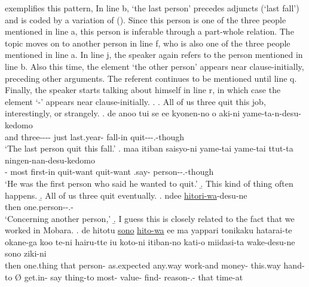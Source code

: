 \Next exemplifies this pattern,
In line b,  `the last person' precedes adjuncts (`last fall') and is coded by a variation of  ().
Since this person is one of the three people mentioned in line a,
this person is inferable
through a part-whole relation.
The topic moves on to another person in line f, who is also one of the three people mentioned in line a.
In line j, the speaker again refers to the person mentioned in line b.
Also this time, the element  `the other person' appears near clause-initially, preceding other arguments.
The referent continues to be mentioned until line q.
Finally, the speaker starts talking about himself in line r,
in which case the element  `-' appears near clause-initially.
%
\ex.
 \a. All of us three quit this job, interestingly, or strangely.
 \bg. de anoo  tui se ee kyonen-no o aki-ni yame-ta-n-desu-kedomo \\
 	and  three---- just   last.year-  fall-in quit---.-though \\
	`The last person quit this fall.'
 \bg.  maa itiban saisyo-ni yame-tai yame-tai ttut-ta ningen-nan-desu-kedomo \\
 		-  most first-in quit-want quit-want .say- person--.-though \\
		`He was the first person who said he wanted to quit.'
 \b. This kind of thing often happens.
 \b. All of us three quit eventually.
 \bg. ndee \ul{hitori-wa}-desu-ne \\
 		then one.person--.- \\
		`Concerning another person,'
 \b. I guess this is closely related to the fact that we worked in Mobara.
 \bg. de hitotu \ul{sono} \ul{hito-wa} ee ma yappari tonikaku hatarai-te okane-ga koo te-ni \EM{\O} hairu-tte iu koto-ni itiban-no kati-o miidasi-ta wake-desu-ne sono ziki-ni \\
 		then one.thing that person- \ab{fl}  as.expected any.way work-and money- this.way hand-to {\O} get.in- say thing-to most- value- find- reason-.- that time-at \\
